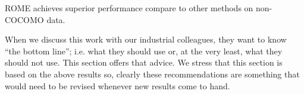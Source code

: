  \begin{result}{2}
ROME achieves superior performance compare to other methods on non-COCOMO data.
 \end{result}




 


 

 When we discuss this work with our industrial colleagues, they want to know ``the bottom line''; i.e. what they should use or, at the very least, what they should not use. This section offers that advice. We stress that this  section is  based on the above results so, clearly these   recommendations are something that would need to be revised whenever new results come to hand.



